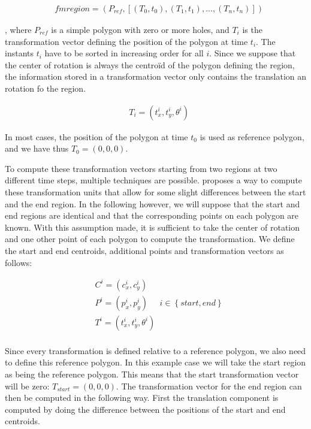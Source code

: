 	\begin{equation}
	\begin{split}
		& fmregion = (P_{ref}, [(T_0, t_0), (T_1, t_1), ..., (T_n, t_n)])
	\end{split}
	\end{equation}

	, where \( P_{ref} \) is a simple polygon with zero or more holes, and \( T_i \) is the transformation vector defining the position of the polygon at time \( t_i \). The instants \( t_i \) have to be sorted in increasing order for all \( i \). Since we suppose that the center of rotation is always the centroïd of the polygon defining the region, the information stored in a transformation vector only contains the translation an rotation fo the region. 

	\begin{equation}
	\begin{split}
		& T_{i} = \left ( t_x^{i}, t_y^{i}, \theta^{i} \right )
	\end{split}
	\end{equation}

	In most cases, the position of the polygon at time \( t_0 \) is used as reference polygon, and we have thus \( T_0 = (0, 0, 0) \).

	To compute these transformation vectors starting from two regions at two different time steps, multiple techniques are possible. \cite{fmregion} proposes a way to compute these transformation units that allow for some slight differences between the start and the end region. In the following however, we will suppose that the start and end regions are identical and that the corresponding points on each polygon are known. With this assumption made, it is sufficient to take the center of rotation and one other point of each polygon to compute the transformation. We define the start and end centroids, additional points and transformation vectors as follows:

	\begin{equation}
	\begin{split}
		& C^{i} = (c_{x}^{i}, c_{y}^{i}) \\
		& P^{i} = (p_{x}^{i}, p_{y}^{i}) \; \; \; \; \; i \in \left \{ start, end \right \} \\
		& T^{i} = \left ( t_x^{i}, t_y^{i}, \theta^{i} \right ) \\ 
	\end{split}
	\end{equation}

	Since every transformation is defined relative to a reference polygon, we also need to define this reference polygon. In this example case we will take the start region as being the reference polygon. This means that the start transformation vector will be zero: \( T_{start} = \left ( 0, 0, 0 \right ) \). The transformation vector for the end region can then be computed in the following way. First the translation component is computed by doing the difference between the positions of the start and end centroids.


